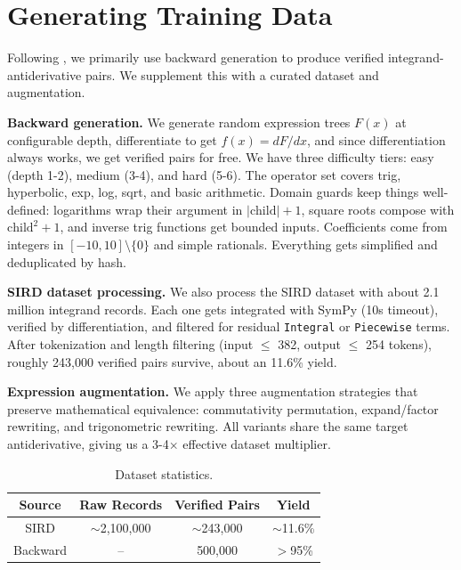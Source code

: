 \documentclass[conference]{IEEEtran}
\begin{document}
\section{Generating Training Data}

Following \cite{b19}, we primarily use backward generation to produce verified integrand-antiderivative pairs. We supplement this with a curated dataset and augmentation.

\textbf{Backward generation.} We generate random expression trees $F(x)$ at configurable depth, differentiate to get $f(x) = dF/dx$, and since differentiation always works, we get verified pairs for free. We have three difficulty tiers: easy (depth 1-2), medium (3-4), and hard (5-6). The operator set covers trig, hyperbolic, exp, log, sqrt, and basic arithmetic. Domain guards keep things well-defined: logarithms wrap their argument in $|\text{child}| + 1$, square roots compose with $\text{child}^2 + 1$, and inverse trig functions get bounded inputs. Coefficients come from integers in $[-10, 10] \setminus \{0\}$ and simple rationals. Everything gets simplified and deduplicated by hash.

\textbf{SIRD dataset processing.} We also process the SIRD dataset with about 2.1 million integrand records. Each one gets integrated with SymPy (10s timeout), verified by differentiation, and filtered for residual \texttt{Integral} or \texttt{Piecewise} terms. After tokenization and length filtering (input $\leq$ 382, output $\leq$ 254 tokens), roughly 243,000 verified pairs survive, about an 11.6\% yield.

\textbf{Expression augmentation.} We apply three augmentation strategies that preserve mathematical equivalence: commutativity permutation, expand/factor rewriting, and trigonometric rewriting. All variants share the same target antiderivative, giving us a 3-4$\times$ effective dataset multiplier.

\begin{table}[htbp]
\caption{Dataset statistics.}
\begin{center}
\begin{tabular}{|c|c|c|c|}
\hline
\textbf{Source} & \textbf{Raw Records} & \textbf{Verified Pairs} & \textbf{Yield} \\
\hline
SIRD & $\sim$2,100,000 & $\sim$243,000 & $\sim$11.6\% \\
\hline
Backward & -- & 500,000 & $>$95\% \\
\hline
\end{tabular}
\label{tab:dataset}
\end{center}
\end{table}
\end{document}
